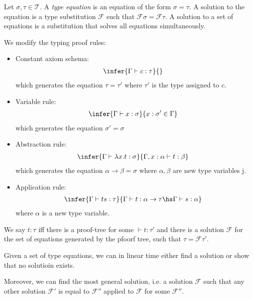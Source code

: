 \documentclass{article}
\begin{document}
\begin{definition*}[]
	Let $\sigma,\tau\in\mathcal{T}$. A \emph{type equation} is an equation of the form $\sigma=\tau$. A solution
	to the equation is a type substitution $\mathcal{F}$ such that $\mathcal{F}\sigma=\mathcal{F}\tau$. A
	solution to a set of equations is a substitution that solves all equations simultaneously.

	We modify the typing proof rules:
	\begin{itemize}
		\item Constant axiom schema: \begin{align*}
			      \infer{\Gamma\vdash c:\tau}{}
		      \end{align*}
		      which generates the equation $\tau=\tau'$ where $\tau'$ is the type assigned to $c$.
		\item Variable rule: \begin{align*}
			      \infer{\Gamma\vdash x:\sigma}{x:\sigma'\in\Gamma}
		      \end{align*}
		      which generates the equation $\sigma'=\sigma$
		\item Abstraction rule: \begin{align*}
			      \infer{\Gamma\vdash\lambda x.t:\sigma}{\Gamma,x:\alpha\vdash t:\beta}
		      \end{align*}
		      which generates the equation $\alpha\to\beta = \sigma$ where $\alpha,\beta$ are new type variables j.
		\item Application rule: \begin{align*}
			      \infer{\Gamma\vdash ts:\tau}{\Gamma\vdash t:\alpha\to\tau\hs \Gamma\vdash s:\alpha}
		      \end{align*}
		      where $\alpha$ is a new type variable.
	\end{itemize}
	We say $t:\tau$ iff there is a proof-tree for some $\vdash t:\tau'$ and there is a solution $\mathcal{F}$
	for the set of equations generated by the pfoorf tree, such that $\tau=\mathcal{F}\tau'$.
\end{definition*}

\begin{proposition*}[III.22]
	Given a set of type equations, we can in linear time either find a solution or show that no solutioin exists.

	Moreover, we can find the most general solution, i.e. a solution $\mathcal{F}$ such that any other
	solution $\mathcal{F}'$ is equal to $\mathcal{F}''$ applied to $\mathcal{F}$ for some $\mathcal{F}''$.
\end{proposition*}
\end{document}
